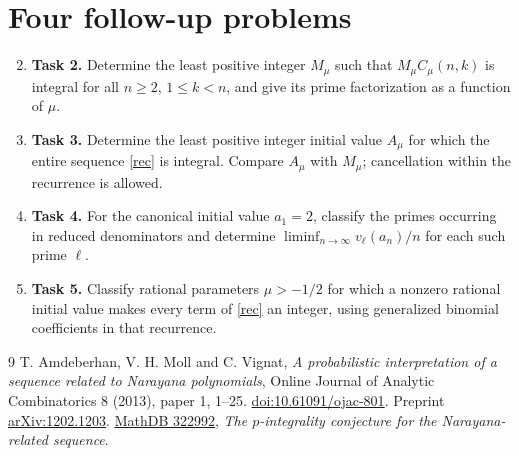 \documentclass[11pt]{article}
\begin{document}
\section*{Four follow-up problems}
\begin{enumerate}
\setcounter{enumi}{1}
\item \textbf{Task 2.} Determine the least positive integer $M_\mu$ such
that $M_\mu C_\mu(n,k)$ is integral for all $n\ge2$, $1\le k<n$,
and give its prime factorization as a function of $\mu$.
\item \textbf{Task 3.} Determine the least positive integer initial value
$A_\mu$ for which the entire sequence \eqref{rec} is integral. Compare
$A_\mu$ with $M_\mu$; cancellation within the recurrence is allowed.
\item \textbf{Task 4.} For the canonical initial value $a_1=2$, classify
the primes occurring in reduced denominators and determine
$\liminf_{n\to\infty}v_\ell(a_n)/n$ for each such prime $\ell$.
\item \textbf{Task 5.} Classify rational parameters $\mu>-1/2$ for which
a nonzero rational initial value makes every term of \eqref{rec} an
integer, using generalized binomial coefficients in that recurrence.
\end{enumerate}

\begin{thebibliography}{9}
T. Amdeberhan, V. H. Moll and C. Vignat,
\emph{A probabilistic interpretation of a sequence related to Narayana
polynomials}, Online Journal of Analytic Combinatorics 8 (2013),
paper 1, 1--25.
\href{https://doi.org/10.61091/ojac-801}{doi:10.61091/ojac-801}.
Preprint \href{https://arxiv.org/abs/1202.1203}{arXiv:1202.1203}.
\href{https://mathdb.com/p/322992}{MathDB 322992},
\emph{The $p$-integrality conjecture for the Narayana-related sequence}.
\end{thebibliography}
\end{document}
